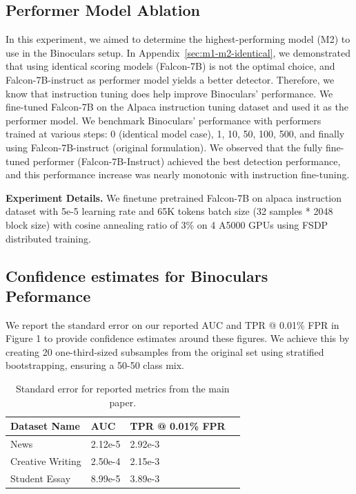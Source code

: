 \documentclass{article} %
\begin{document}
\subsection{Performer Model Ablation}
In this experiment, we aimed to determine the highest-performing model (M2) to use in the Binoculars setup. In Appendix~\ref{sec:m1-m2-identical}, we demonstrated that using identical scoring models (Falcon-7B) is not the optimal choice, and Falcon-7B-instruct as performer model yields a better detector. Therefore, we know that instruction tuning does help improve Binoculars' performance. We fine-tuned Falcon-7B on the Alpaca instruction tuning dataset and used it as the performer model. We benchmark Binoculars' performance with performers trained at various steps: 0 (identical model case), 1, 10, 50, 100, 500, and finally using Falcon-7B-instruct (original formulation). We observed that the fully fine-tuned performer (Falcon-7B-Instruct) achieved the best detection performance, and this performance increase was nearly monotonic with instruction fine-tuning.

\textbf{Experiment Details.} We finetune pretrained Falcon-7B on alpaca instruction dataset with 5e-5 learning rate and 65K tokens batch size (32 samples * 2048 block size) with cosine annealing ratio of 3\% on 4 A5000 GPUs using FSDP distributed training.

\subsection{Confidence estimates for Binoculars Peformance}

We report the standard error on our reported AUC and TPR @ 0.01\% FPR in Figure 1 to provide confidence estimates around these figures. We achieve this by creating 20 one-third-sized subsamples from the original set using stratified bootstrapping, ensuring a 50-50 class mix.

\begin{table}[ht!]
\caption{Standard error for reported metrics from the main paper.}
\centering
\begin{tabular}{llll}
\hline
Dataset Name & AUC     & TPR @ 0.01\% FPR &  \\
\hline
News             & 2.12e-5 & 2.92e-3          &  \\
Creative Writing & 2.50e-4 & 2.15e-3          &  \\
Student Essay    & 8.99e-5 & 3.89e-3          &  \\
\hline
\end{tabular}
\end{table}
\end{document}
